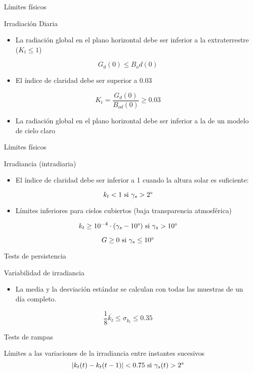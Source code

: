 \documentclass[xcolor={usenames,svgnames,dvipsnames}]{beamer}
\let\cite\parencite
\begin{document}
\begin{frame}[label=sec-3-2]{Límites físicos}
\begin{block}{Irradiación Diaria}
\begin{itemize}
\item La radiación global en el plano horizontal debe ser inferior a la extraterrestre ($K_t \leq 1$)
\end{itemize}
\[
G_d(0) \leq B_od(0)
\]

\begin{itemize}
\item El índice de claridad debe ser superior a 0.03
\end{itemize}
\[
K_t = \frac{G_d(0)}{B_{od}(0)} \geq 0.03
\]

\begin{itemize}
\item La radiación global en el plano horizontal debe ser inferior a la de un modelo de cielo claro
\end{itemize}

\cite{Younes.Claywell.ea2005, Estevez.Gavilan.ea2011, Geiger.Diabate.ea2002}
\end{block}
\end{frame}
\begin{frame}[label=sec-3-3]{Límites físicos}
\begin{block}{Irradiancia (intradiaria)}
\begin{itemize}
\item El índice de claridad debe ser inferior a 1 cuando la altura solar es suficiente:
\end{itemize}
\[
k_t < 1  \text{ si } \gamma_s > 2\degree 
\]
\begin{itemize}
\item Límites inferiores para cielos cubiertos (baja transparencia atmosférica)
\end{itemize}
\[
k_t \geq 10^{-4} \cdot (\gamma_s - 10\degree)  \text{ si } \gamma_s > 10\degree
\]

\[
G \geq 0  \text{ si } \gamma_s \leq 10\degree
\]

\cite{Journee.Bertrand2011}
\end{block}
\end{frame}
\begin{frame}[label=sec-3-4]{Tests de persistencia}
\begin{block}{Variabilidad de irradiancia}
\begin{itemize}
\item La media y la desviación estándar se calculan con todas las muestras de un día completo.
\end{itemize}
\[
\frac{1}{8} \overline{k_t} \leq \sigma_{k_t} \leq 0.35
\]
\end{block}
\end{frame}
\begin{frame}[label=sec-3-5]{Tests de rampas}
\begin{block}{Límites a las variaciones de la irradiancia entre instantes sucesivos}
\[
\left| k_t(t) - k_t(t-1)\right| < 0.75 \text{ si } \gamma_s(t) > 2\degree
\]
\end{block}
\end{frame}
\end{document}

